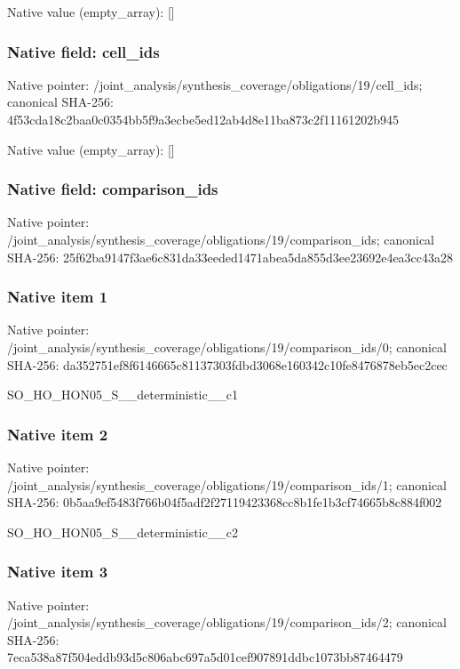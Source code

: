 \documentclass[10pt,a4paper]{article}
\begin{document}
Native value (empty\_\allowbreak{}array): []

\subsubsection{Native field: cell\_\allowbreak{}ids}
Native pointer: /joint\_\allowbreak{}analysis/synthesis\_\allowbreak{}coverage/obligations/19/cell\_\allowbreak{}ids; canonical SHA-256: 4f53cda18c2baa0c0354bb5f9a3ecbe5ed12ab4d8e11ba873c2f11161202b945

Native value (empty\_\allowbreak{}array): []

\subsubsection{Native field: comparison\_\allowbreak{}ids}
Native pointer: /joint\_\allowbreak{}analysis/synthesis\_\allowbreak{}coverage/obligations/19/comparison\_\allowbreak{}ids; canonical SHA-256: 25f62ba9147f3ae6c831da33eeded1471abea5da855d3ee23692e4ea3cc43a28

\subsubsection{Native item 1}
Native pointer: /joint\_\allowbreak{}analysis/synthesis\_\allowbreak{}coverage/obligations/19/comparison\_\allowbreak{}ids/0; canonical SHA-256: da352751ef8f6146665c81137303fdbd3068e160342c10fe8476878eb5ec2cec

\begingroup\raggedright\sloppy SO\_\allowbreak{}HO\_\allowbreak{}HON05\_\allowbreak{}S\_\allowbreak{}\_\allowbreak{}deterministic\_\allowbreak{}\_\allowbreak{}c1\par\endgroup

\subsubsection{Native item 2}
Native pointer: /joint\_\allowbreak{}analysis/synthesis\_\allowbreak{}coverage/obligations/19/comparison\_\allowbreak{}ids/1; canonical SHA-256: 0b5aa9ef5483f766b04f5adf2f27119423368cc8b1fe1b3cf74665b8c884f002

\begingroup\raggedright\sloppy SO\_\allowbreak{}HO\_\allowbreak{}HON05\_\allowbreak{}S\_\allowbreak{}\_\allowbreak{}deterministic\_\allowbreak{}\_\allowbreak{}c2\par\endgroup

\subsubsection{Native item 3}
Native pointer: /joint\_\allowbreak{}analysis/synthesis\_\allowbreak{}coverage/obligations/19/comparison\_\allowbreak{}ids/2; canonical SHA-256: 7eca538a87f504eddb93d5c806abc697a5d01cef907891ddbc1073bb87464479
\end{document}
